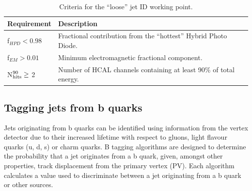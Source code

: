 \begin{table}[!ht]
  \caption{Criteria for the ``loose'' jet ID working point.\label{tab:jet_id_loose}}
  \footnotesize
  \begin{center}
    \begin{tabular}{ll}
      \hline
      \hline
      Requirement                & Description                                                      \\
      \hline
      f$_{HPD} < 0.98$           & Fractional contribution from the ``hottest'' Hybrid Photo Diode. \\
      f$_{EM} > 0.01$            & Minimum electromagnetic fractional component.                    \\
      N$^{90}_{\rm hits} \geq$ 2 & Number of HCAL channels containing at least
      90\% of total energy.      \\
      \hline
      \hline
    \end{tabular}
  \end{center}
\end{table}


\subsection{Tagging jets from b quarks}

Jets originating from b quarks can be identified using information from the 
vertex detector due to their increased lifetime with respect to gluons, light
flavour quarks (u, d, s) or charm quarks. 
B tagging algorithms are designed to determine the probability that a jet 
originates from a b quark, given, amongst other properties, track
displacement from the primary vertex (PV). Each algorithm
calculates a value used to discriminate between a jet originating from a
b quark or other sources.

